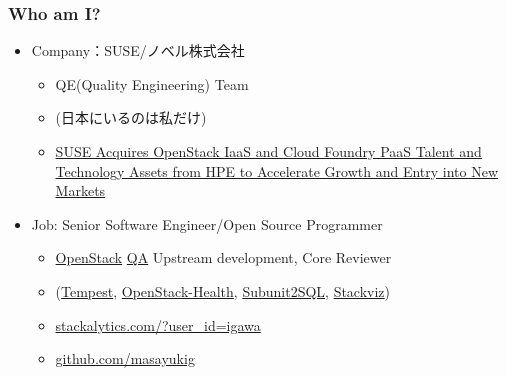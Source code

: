 \documentclass[aspectratio=169,11pt,hyperref={colorlinks=true}]{beamer}
\begin{document}
\begin{frame}
  \frametitle{Who am I?}
  \begin{itemize}
    \item Company：SUSE/ノベル株式会社
      \begin{itemize}
        \item QE(Quality Engineering) Team
        \item[] (日本にいるのは私だけ)
        \item \href{https://www.suse.com/newsroom/post/2016/suse-acquires-openstack-iaas-and-cloud-foundry-paas-talent-and-technology-assets-from-hpe-to-accelerate-growth-and-entry-into-new-markets/}{SUSE Acquires OpenStack IaaS and Cloud Foundry PaaS Talent and Technology Assets from HPE to Accelerate Growth and Entry into New Markets}
      \end{itemize}
    \item Job: Senior Software Engineer/Open Source Programmer
      \begin{itemize}
        \item \href{https://www.openstack.org/}{OpenStack}
         \href{https://wiki.openstack.org/wiki/QA}{QA} Upstream development, Core Reviewer
        \item[] (\href{https://docs.openstack.org/developer/tempest/}{Tempest},
         \href{http://status.openstack.org/openstack-health/}{OpenStack-Health},
         \href{https://docs.openstack.org/developer/subunit2sql/}{Subunit2SQL},
         \href{https://docs.openstack.org/developer/stackviz/}{Stackviz})
        \item \href{http://stackalytics.com/?user_id=igawa&release=all&metric=all}{stackalytics.com/?user\_id=igawa}
        \item \href{https://github.com/masayukig}{github.com/masayukig}
      \end{itemize}
  \end{itemize}
\end{frame}
\end{document}
